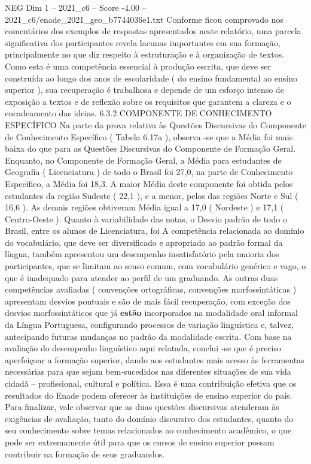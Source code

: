 \begin{textsample}{NEG Dim 1 – 2021\_c6 – Score -4.00 – 2021\_c6/enade\_2021\_geo\_b7744036e1.txt}
Conforme ficou comprovado nos comentários dos exemplos de respostas apresentados neste relatório, uma parcela significativa dos participantes revela lacunas importantes em sua formação, principalmente no que diz respeito à estruturação e à organização de textos.
Como esta é uma competência essencial à produção escrita, que deve ser construída ao longo dos anos de escolaridade ( do ensino fundamental ao ensino superior ), sua recuperação é trabalhosa e depende de um esforço intenso de exposição a textos e de reflexão sobre os requisitos que garantem a clareza e o encadeamento das ideias. 6.3.2 COMPONENTE DE CONHECIMENTO ESPECÍFICO Na parte da prova relativa às Questões Discursivas do Componente de Conhecimento Específico ( Tabela 6.17a ), observa -se que a Média foi mais baixa do que para as Questões Discursivas do Componente de Formação Geral.
Enquanto, no Componente de Formação Geral, a Média para estudantes de Geografia ( Licenciatura ) de todo o Brasil foi 27,0, na parte de Conhecimento Específico, a Média foi 18,3.
A maior Média deste componente foi obtida pelos estudantes da região Sudeste ( 22,1 ), e a menor, pelos das regiões Norte e Sul ( 16,6 ).
As demais regiões obtiveram Média igual a 17,0 ( Nordeste ) e 17,1 ( Centro-Oeste ).
Quanto à variabilidade das notas, o Desvio padrão de todo o Brasil, entre os alunos de Licenciatura, foi A competência relacionada ao domínio do vocabulário, que deve ser diversificado e apropriado ao padrão formal da língua, também apresentou um desempenho insatisfatório pela maioria dos participantes, que se limitam ao senso comum, com vocabulário genérico e vago, o que é inadequado para atender ao perfil de um graduando.
As outras duas competências avaliadas ( convenções ortográficas, convenções morfossintáticas ) apresentam desvios pontuais e são de mais fácil recuperação, com exceção dos desvios morfossintáticos que já \textbf{estão} incorporados na modalidade oral informal da Língua Portuguesa, configurando processos de variação linguística e, talvez, antecipando futuras mudanças no padrão da modalidade escrita.
Com base na avaliação do desempenho linguístico aqui relatada, conclui -se que é preciso aperfeiçoar a formação superior, dando aos estudantes mais acesso às ferramentas necessárias para que sejam bem-sucedidos nas diferentes situações de sua vida cidadã – profissional, cultural e política.
Essa é uma contribuição efetiva que os resultados do Enade podem oferecer às instituições de ensino superior do país.
Para finalizar, vale observar que as duas questões discursivas atenderam às exigências de avaliação, tanto do domínio discursivo dos estudantes, quanto do seu conhecimento sobre temas relacionados ao conhecimento acadêmico, o que pode ser extremamente útil para que os cursos de ensino superior possam contribuir na formação de seus graduandos.

\end{textsample}
